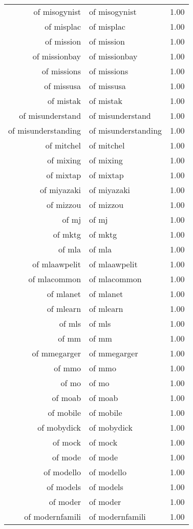 \begin{table}[ht]
\begin{tabular}{rlr}
  of misogynist & of misogynist & 1.00 \\ 
  of misplac & of misplac & 1.00 \\ 
  of mission & of mission & 1.00 \\ 
  of missionbay & of missionbay & 1.00 \\ 
  of missions & of missions & 1.00 \\ 
  of missusa & of missusa & 1.00 \\ 
  of mistak & of mistak & 1.00 \\ 
  of misunderstand & of misunderstand & 1.00 \\ 
  of misunderstanding & of misunderstanding & 1.00 \\ 
  of mitchel & of mitchel & 1.00 \\ 
  of mixing & of mixing & 1.00 \\ 
  of mixtap & of mixtap & 1.00 \\ 
  of miyazaki & of miyazaki & 1.00 \\ 
  of mizzou & of mizzou & 1.00 \\ 
  of mj & of mj & 1.00 \\ 
  of mktg & of mktg & 1.00 \\ 
  of mla & of mla & 1.00 \\ 
  of mlaawpelit & of mlaawpelit & 1.00 \\ 
  of mlacommon & of mlacommon & 1.00 \\ 
  of mlanet & of mlanet & 1.00 \\ 
  of mlearn & of mlearn & 1.00 \\ 
  of mls & of mls & 1.00 \\ 
  of mm & of mm & 1.00 \\ 
  of mmegarger & of mmegarger & 1.00 \\ 
  of mmo & of mmo & 1.00 \\ 
  of mo & of mo & 1.00 \\ 
  of moab & of moab & 1.00 \\ 
  of mobile & of mobile & 1.00 \\ 
  of mobydick & of mobydick & 1.00 \\ 
  of mock & of mock & 1.00 \\ 
  of mode & of mode & 1.00 \\ 
  of modello & of modello & 1.00 \\ 
  of models & of models & 1.00 \\ 
  of moder & of moder & 1.00 \\ 
  of modernfamili & of modernfamili & 1.00 \\ 

\end{tabular}
\end{table}
